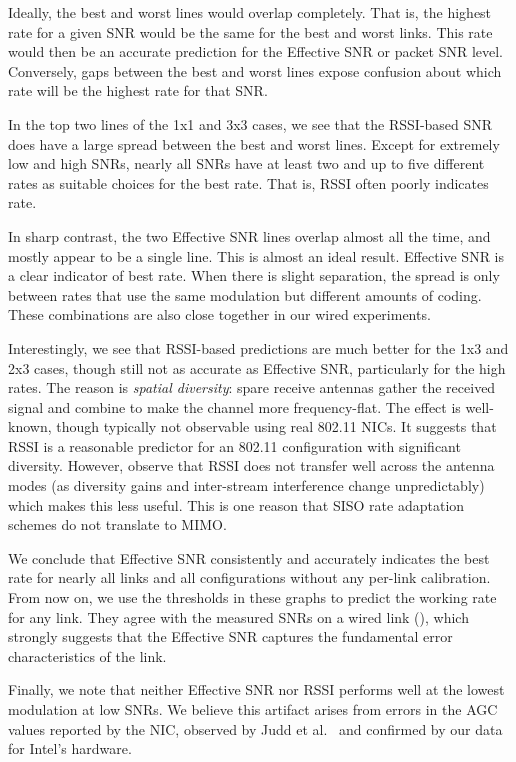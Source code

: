 Ideally, the best and worst lines would overlap completely. %
That is, the highest rate for a given SNR would be the same for the best and worst links. This rate would then be an accurate prediction for the Effective SNR or packet SNR level. Conversely, gaps between the best and worst lines expose confusion about which rate will be the highest rate for that SNR\@.

In the top two lines of the 1x1 and 3x3 cases, we see that the RSSI-based SNR does have a large spread between the best and worst lines. Except for extremely low and high SNRs, nearly all SNRs have at least two and up to five different rates as suitable choices for the best rate. That is, RSSI often poorly indicates rate.

In sharp contrast, %
the two Effective SNR lines overlap almost all the time, and mostly appear to be a single line. This is almost an ideal result. Effective SNR is a clear indicator of best rate. When there is slight separation, the spread is only between rates that use the same modulation but different amounts of coding. These combinations are also close together in our wired experiments. 

Interestingly, we see that RSSI-based predictions are much better for the 1x3 and 2x3 cases, though still not as accurate as Effective SNR, particularly for the high rates. The reason is \emph{spatial diversity}: spare receive antennas gather the received signal and combine to make the channel more frequency-flat. The effect is well-known, though typically not observable using real 802.11 NICs. It suggests that RSSI is a reasonable predictor for an 802.11 configuration with significant diversity. However, observe that RSSI does not transfer well across the antenna modes (as diversity gains and inter-stream interference change unpredictably) which makes this less useful. This is one reason that SISO rate adaptation schemes do not translate to MIMO\@.

We conclude that Effective SNR consistently and accurately indicates the best rate for nearly all links and all configurations without any per-link calibration. From now on, we use the thresholds in these graphs to predict the working rate for any link. They agree with the measured SNRs on a wired link (), which strongly suggests that the Effective SNR captures the fundamental error characteristics of the link. 

Finally, we note that neither Effective SNR nor RSSI performs well at the lowest modulation at low SNRs. We believe this artifact arises from errors in the AGC values reported by the NIC, observed by Judd et al.~\cite{Judd_CHARM} and confirmed by our data for Intel's hardware.

